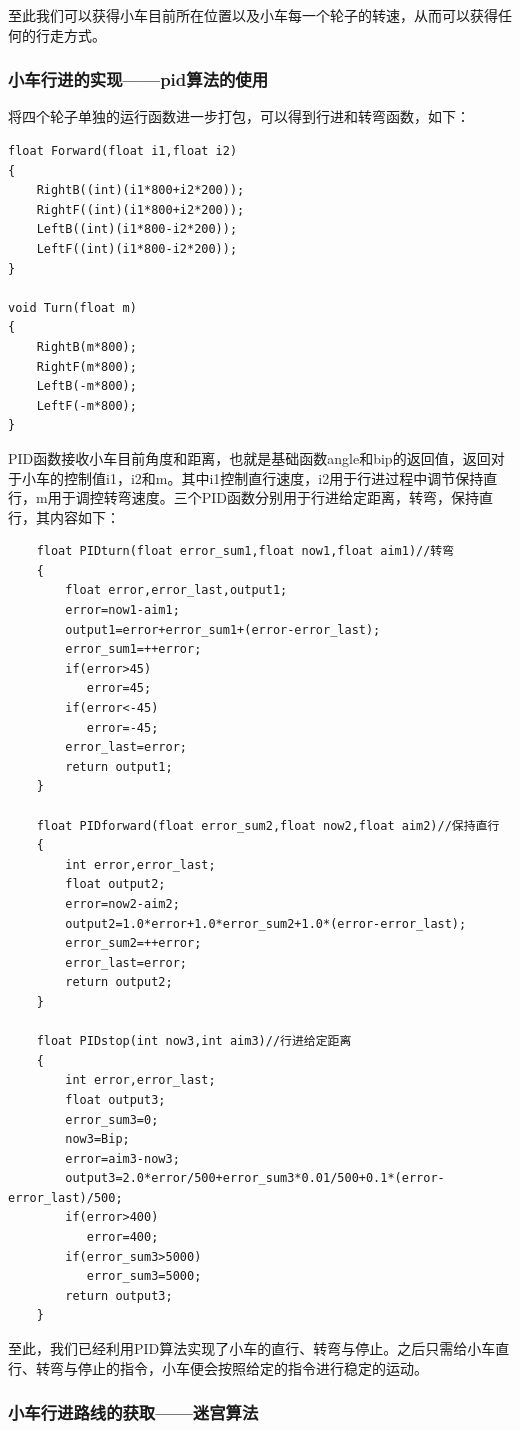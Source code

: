 \documentclass[UTF8]{ctexart}
\begin{document}
    至此我们可以获得小车目前所在位置以及小车每一个轮子的转速，从而可以获得任何的行走方式。

\subsubsection{小车行进的实现——pid算法的使用}
将四个轮子单独的运行函数进一步打包，可以得到行进和转弯函数，如下：
\begin{lstlisting}
float Forward(float i1,float i2)
{
	RightB((int)(i1*800+i2*200));
	RightF((int)(i1*800+i2*200));
	LeftB((int)(i1*800-i2*200));
	LeftF((int)(i1*800-i2*200));
}

void Turn(float m)
{
	RightB(m*800);
	RightF(m*800);
	LeftB(-m*800);
	LeftF(-m*800);
}
\end{lstlisting}

PID函数接收小车目前角度和距离，也就是基础函数angle和bip的返回值，返回对于小车的控制值i1，i2和m。其中i1控制直行速度，i2用于行进过程中调节保持直行，m用于调控转弯速度。三个PID函数分别用于行进给定距离，转弯，保持直行，其内容如下：
\begin{lstlisting}
    float PIDturn(float error_sum1,float now1,float aim1)//转弯
    {
        float error,error_last,output1;
        error=now1-aim1;
        output1=error+error_sum1+(error-error_last);
        error_sum1=++error;
        if(error>45)
           error=45;
        if(error<-45)
           error=-45;
        error_last=error;
        return output1;
    }
    
    float PIDforward(float error_sum2,float now2,float aim2)//保持直行
    {
        int error,error_last;
        float output2;
        error=now2-aim2;
        output2=1.0*error+1.0*error_sum2+1.0*(error-error_last);
        error_sum2=++error;
        error_last=error;
        return output2;
    }
    
    float PIDstop(int now3,int aim3)//行进给定距离
    {
        int error,error_last;
        float output3;
        error_sum3=0;
        now3=Bip;
        error=aim3-now3;
        output3=2.0*error/500+error_sum3*0.01/500+0.1*(error-error_last)/500;
        if(error>400)
           error=400;
        if(error_sum3>5000)
           error_sum3=5000;
        return output3;
    }
    \end{lstlisting}

    至此，我们已经利用PID算法实现了小车的直行、转弯与停止。之后只需给小车直行、转弯与停止的指令，小车便会按照给定的指令进行稳定的运动。
\subsubsection{小车行进路线的获取——迷宫算法}
\end{document}
